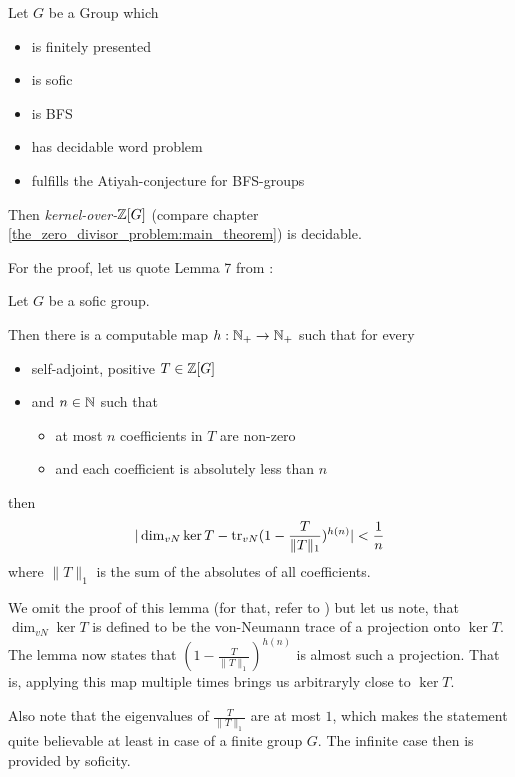 \begin{Theorem}
	\label{decidable_zero_divisors:theorem}
	Let $G$ be a Group which
	\begin{itemize}
		\item is finitely presented
		\item is sofic
		\item is BFS
		\item has decidable word problem
		\item fulfills the Atiyah-conjecture for BFS-groups
	\end{itemize}

	Then \emph{kernel-over-$\mathbb{Z}[G]$} (compare chapter \ref{the_zero_divisor_problem:main_theorem}) is decidable.
\end{Theorem}
For the proof, let us quote Lemma 7 from \cite{gra14-2}:
\begin{Lemma}
		\label{decidable_zero_divisors:lemma_sofic}
	Let $G$ be a sofic group.

	Then there is a computable map $h: \mathbb{N}_+ \to \mathbb{N}_+$ such that for every
	\begin{itemize}
		\item self-adjoint, positive $T \in \mathbb{Z}[G]$
		\item and $n \in \mathbb{N}$ such that
		\begin{itemize}
			\item at most $n$ coefficients in $T$ are non-zero
			\item and each coefficient is absolutely less than $n$
		\end{itemize}
	\end{itemize}
	then
	\begin{align*}
		| \dim_{vN} \ker T - \operatorname{tr}_{vN}(1 - \frac{T}{\|T\|_1})^{h(n)} | < \frac{1}{n}
	\end{align*}
	where $\|T\|_1$ is the sum of the absolutes of all coefficients.
\end{Lemma}
We omit the proof of this lemma (for that, refer to \cite{gra14-2}) but let us note, that $\dim_{vN} \ker T$ is defined to be the von-Neumann trace of a projection onto $\ker T$.
The lemma now states that $(1 - \frac{T}{\|T\|_1})^{h(n)}$ is almost such a projection. That is, applying this map multiple times brings us arbitraryly close to $\ker T$.

Also note that the eigenvalues of $\frac{T}{\|T\|_1}$ are at most $1$, which makes the statement quite believable at least in case of a finite group $G$.
The infinite case then is provided by soficity.

